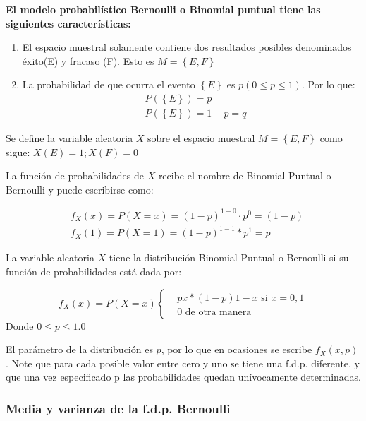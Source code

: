 \textbf{El modelo probabilístico Bernoulli o Binomial puntual tiene las siguientes características:}

\begin{enumerate}
    \item El espacio muestral solamente contiene dos resultados posibles
          denominados éxito(E) y fracaso (F). Esto es $M=\left\{E,F\right\}$
    \item La probabilidad de que ocurra el evento $\left\{E\right\}$  es $p (0\leq p\leq 1)$. Por lo que:
          \begin{align*}
               & P(\left\{E\right\})=p     \\
               & P(\left\{E\right\})=1-p=q
          \end{align*}
\end{enumerate}


Se define la variable aleatoria $X$ sobre el espacio muestral $M=\left\{E,F\right\}$  como sigue: $X(E)=1; X(F)=0$

La función de probabilidades de $X$ recibe el nombre de Binomial Puntual o
Bernoulli y puede escribirse como:

\begin{align*}
     & f_X(x)=P(X=x)=(1-p)^{1-0}\cdot p^0=(1-p ) \\
     & f_X(1)=P( X=1)=(1-p)^{1-1}*p^1=p
\end{align*}

\begin{definition}
    La variable aleatoria $X$ tiene la distribución Binomial Puntual o Bernoulli si
    su función de probabilidades está dada por:

    \begin{equation}
        f_X(x)=P(X=x)\begin{cases}
             & px*(1-p)1-x\text{ si } x=0,1 \\
             & 0\text{ de otra manera}
        \end{cases}
    \end{equation}
    Donde $0\leq p\leq 1.0$
\end{definition}

El parámetro de la distribución es $p$, por lo que en ocasiones se escribe
$f_X(x,p)$. Note que para cada posible valor entre cero y uno se tiene una
f.d.p. diferente, y que una vez especificado p las probabilidades quedan
unívocamente determinadas.

\subsubsection{Media y varianza de la f.d.p. Bernoulli}

